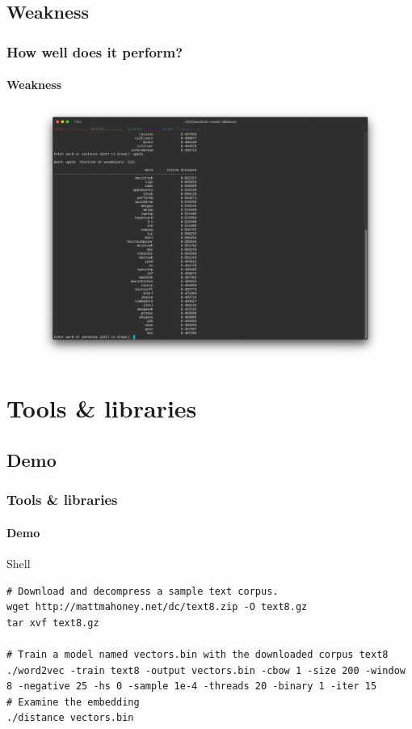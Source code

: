 \documentclass{beamer}
\begin{document}
\subsection{Weakness}
\begin{frame}
    \frametitle{How well does it perform?}
    \framesubtitle{Weakness}
    \begin{figure}
        \includegraphics[scale=0.45]{weakness}
    \end{figure}
\end{frame}

\section{Tools \& libraries}

\subsection{Demo}
\begin{frame}[containsverbatim]
    \frametitle{Tools \& libraries}
    \framesubtitle{Demo}
    \begin{block}{Shell}
        \scriptsize
        \begin{lstlisting}
# Download and decompress a sample text corpus.
wget http://mattmahoney.net/dc/text8.zip -O text8.gz
tar xvf text8.gz

# Train a model named vectors.bin with the downloaded corpus text8
./word2vec -train text8 -output vectors.bin -cbow 1 -size 200 -window 8 -negative 25 -hs 0 -sample 1e-4 -threads 20 -binary 1 -iter 15
# Examine the embedding
./distance vectors.bin
        \end{lstlisting}
    \end{block}
\end{frame}
\end{document}
